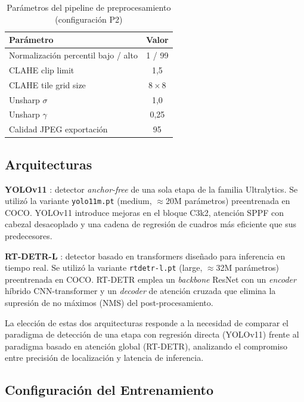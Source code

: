 \documentclass[conference]{IEEEtran}
\begin{document}
\begin{table}[htbp]
\caption{Parámetros del pipeline de preprocesamiento (configuración P2)}
\label{tab:preproc}
\begin{center}
\begin{tabular}{lc}
\toprule
\textbf{Parámetro} & \textbf{Valor} \\
\midrule
Normalización percentil bajo / alto & 1 / 99 \\
CLAHE clip limit                    & 1{,}5  \\
CLAHE tile grid size                & $8 \times 8$ \\
Unsharp $\sigma$                    & 1{,}0  \\
Unsharp $\gamma$                    & 0{,}25 \\
Calidad JPEG exportación            & 95     \\
\bottomrule
\end{tabular}
\end{center}
\end{table}

\subsection{Arquitecturas}

\textbf{YOLOv11} \cite{b3}: detector \textit{anchor-free} de una sola etapa de la
familia Ultralytics. Se utilizó la variante \texttt{yolo11m.pt} (medium, $\approx$20M
parámetros) preentrenada en COCO. YOLOv11 introduce mejoras en el bloque C3k2,
atención SPPF con cabezal desacoplado y una cadena de regresión de cuadros más
eficiente que sus predecesores.

\textbf{RT-DETR-L} \cite{b4}: detector basado en transformers diseñado para
inferencia en tiempo real. Se utilizó la variante \texttt{rtdetr-l.pt} (large,
$\approx$32M parámetros) preentrenada en COCO. RT-DETR emplea un \textit{backbone}
ResNet con un \textit{encoder} híbrido CNN-transformer y un \textit{decoder} de
atención cruzada que elimina la supresión de no máximos (NMS) del post-procesamiento.

La elección de estas dos arquitecturas responde a la necesidad de comparar el
paradigma de detección de una etapa con regresión directa (YOLOv11) frente al
paradigma basado en atención global (RT-DETR), analizando el compromiso entre
precisión de localización y latencia de inferencia.

\subsection{Configuración del Entrenamiento}
\end{document}
